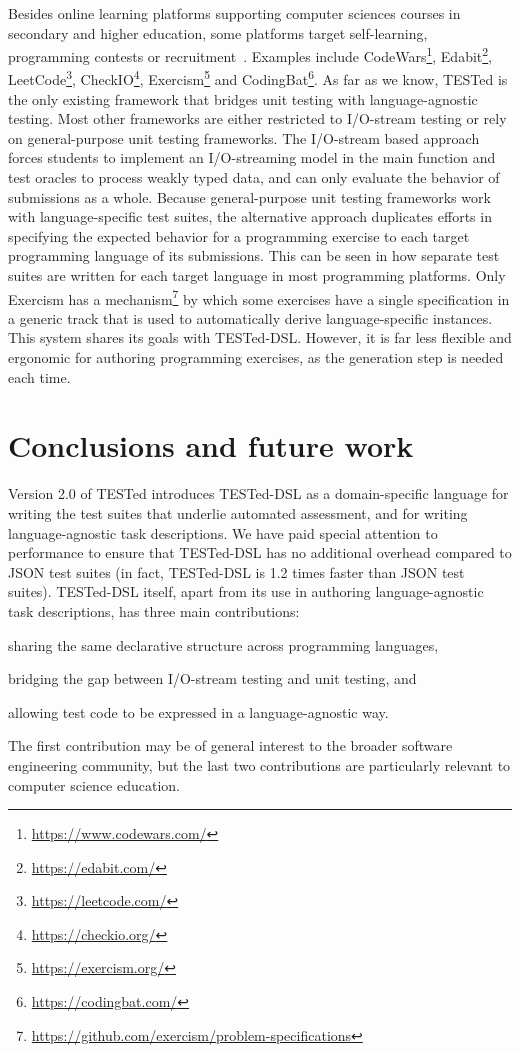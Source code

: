 \documentclass[../main]{subfiles}
\begin{document}
Besides online learning platforms supporting computer sciences courses in secondary and higher education, some platforms target self-learning, programming contests or recruitment~\autocite{hidalgo-cespedesEvaluationOnlineJudge2023}.
Examples include CodeWars\footnote{\url{https://www.codewars.com/}}, Edabit\footnote{\url{https://edabit.com/}}, LeetCode\footnote{\url{https://leetcode.com/}}, CheckIO\footnote{\url{https://checkio.org/}}, Exercism\footnote{\url{https://exercism.org/}} and CodingBat\footnote{\url{https://codingbat.com/}}.
As far as we know, TESTed is the only existing framework that bridges unit testing with language-agnostic testing.
Most other frameworks are either restricted to I/O-stream testing or rely on general-purpose unit testing frameworks.
The I/O-stream based approach forces students to implement an I/O-streaming model in the main function and test oracles to process weakly typed data, and can only evaluate the behavior of submissions as a whole.
Because general-purpose unit testing frameworks work with language-specific test suites, the alternative approach duplicates efforts in specifying the expected behavior for a programming exercise to each target programming language of its submissions.
This can be seen in how separate test suites are written for each target language in most programming platforms.
Only Exercism has a mechanism\footnote{\url{https://github.com/exercism/problem-specifications}} by which some exercises have a single specification in a generic track that is used to automatically derive language-specific instances.
This system shares its goals with TESTed-DSL\@.
However, it is far less flexible and ergonomic for authoring programming exercises, as the generation step is needed each time.

\section{Conclusions and future work}\label{sec:dsl-conclusion-and-future-work}

Version 2.0 of TESTed introduces TESTed-DSL as a domain-specific language for writing the test suites that underlie automated assessment, and for writing language-agnostic task descriptions.
We have paid special attention to performance to ensure that TESTed-DSL has no additional overhead compared to JSON test suites (in fact, TESTed-DSL is 1.2 times faster than JSON test suites).
TESTed-DSL itself, apart from its use in authoring language-agnostic task descriptions, has three main contributions: \begin{enumerate*}[label=\emph{\roman*})] \item sharing the same declarative structure across programming languages, \item bridging the gap between I/O-stream testing and unit testing, and \item allowing test code to be expressed in a language-agnostic way.\end{enumerate*}
The first contribution may be of general interest to the broader software engineering community, but the last two contributions are particularly relevant to computer science education.
\end{document}
